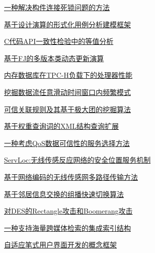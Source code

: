 \documentclass[a4paper]{article}
\begin{document}
\href{http://www.jos.org.cn/ch/reader/download_pdf.aspx?file_no=20081005&year_id=2008&quarter_id=10&falg=1}{一种解决构件连接死锁问题的方法}

\href{http://www.jos.org.cn/ch/reader/download_pdf.aspx?file_no=20081006&year_id=2008&quarter_id=10&falg=1}{基于设计演算的形式化用例分析建模框架}

\href{http://www.jos.org.cn/ch/reader/download_pdf.aspx?file_no=20081007&year_id=2008&quarter_id=10&falg=1}{C代码API一致性检验中的等值分析}

\href{http://www.jos.org.cn/ch/reader/download_pdf.aspx?file_no=20081008&year_id=2008&quarter_id=10&falg=1}{基于FJ的多版本类动态更新演算}

\href{http://www.jos.org.cn/ch/reader/download_pdf.aspx?file_no=20081009&year_id=2008&quarter_id=10&falg=1}{内存数据库在TPC-H负载下的处理器性能}

\href{http://www.jos.org.cn/ch/reader/download_pdf.aspx?file_no=20081010&year_id=2008&quarter_id=10&falg=1}{挖掘数据流任意滑动时间窗口内频繁模式}

\href{http://www.jos.org.cn/ch/reader/download_pdf.aspx?file_no=20081011&year_id=2008&quarter_id=10&falg=1}{可信关联规则及其基于极大团的挖掘算法}

\href{http://www.jos.org.cn/ch/reader/download_pdf.aspx?file_no=20081012&year_id=2008&quarter_id=10&falg=1}{基于权重查询词的XML结构查询扩展}

\href{http://www.jos.org.cn/ch/reader/download_pdf.aspx?file_no=20081013&year_id=2008&quarter_id=10&falg=1}{一种考虑QoS数据可信性的服务选择方法}

\href{http://www.jos.org.cn/ch/reader/download_pdf.aspx?file_no=20081014&year_id=2008&quarter_id=10&falg=1}{ServLoc:无线传感反应网络的安全位置服务机制}

\href{http://www.jos.org.cn/ch/reader/download_pdf.aspx?file_no=20081015&year_id=2008&quarter_id=10&falg=1}{基于网络编码的无线传感网多路径传输方法}

\href{http://www.jos.org.cn/ch/reader/download_pdf.aspx?file_no=20081016&year_id=2008&quarter_id=10&falg=1}{基于邻居信息交换的组播快速切换算法}

\href{http://www.jos.org.cn/ch/reader/download_pdf.aspx?file_no=20081017&year_id=2008&quarter_id=10&falg=1}{对DES的Rectangle攻击和Boomerang攻击}

\href{http://www.jos.org.cn/ch/reader/download_pdf.aspx?file_no=20081018&year_id=2008&quarter_id=10&falg=1}{一种支持海量跨媒体检索的集成索引结构}

\href{http://www.jos.org.cn/ch/reader/download_pdf.aspx?file_no=20081019&year_id=2008&quarter_id=10&falg=1}{自适应笔式用户界面开发的概念框架}
\end{document}
